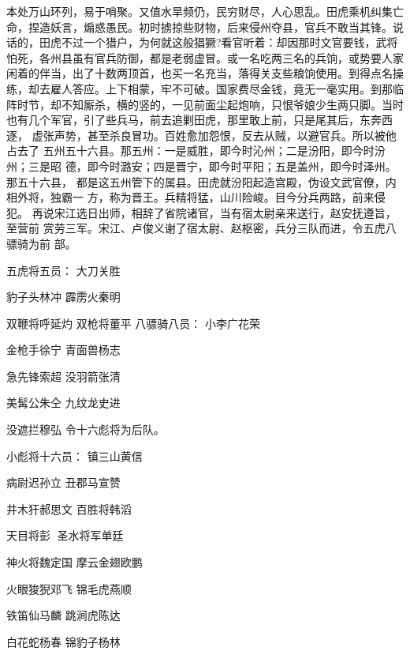 本处万山环列，易于哨聚。又值水旱频仍，民穷财尽，人心思乱。田虎乘机纠集亡
命，捏造妖言，煽惑愚民。初时掳掠些财物，后来侵州夺县，官兵不敢当其锋。说
话的，田虎不过一个猎户，为何就这般猖獗?看官听着：却因那时文官要钱，武将
怕死，各州县虽有官兵防御，都是老弱虚冒。或一名吃两三名的兵饷，或势要人家
闲着的伴当，出了十数两顶首，也买一名充当，落得关支些粮饷使用。到得点名操
练，却去雇人答应。上下相蒙，牢不可破。国家费尽金钱，竟无一毫实用。到那临
阵时节，却不知厮杀，横的竖的，一见前面尘起炮响，只恨爷娘少生两只脚。当时
也有几个军官，引了些兵马，前去追剿田虎，那里敢上前，只是尾其后，东奔西逐，
虚张声势，甚至杀良冒功。百姓愈加怨恨，反去从贼，以避官兵。所以被他占去了
五州五十六县。那五州：一是威胜，即今时沁州；二是汾阳，即今时汾州；三是昭
德，即今时潞安；四是晋宁，即今时平阳；五是盖州，即今时泽州。那五十六县，
都是这五州管下的属县。田虎就汾阳起造宫殿，伪设文武官僚，内相外将，独霸一
方，称为晋王。兵精将猛，山川险峻。目今分兵两路，前来侵犯。
再说宋江选日出师，相辞了省院诸官，当有宿太尉亲来送行，赵安抚遵旨，至营前
赏劳三军。宋江、卢俊义谢了宿太尉、赵枢密，兵分三队而进，令五虎八骠骑为前
部。

五虎将五员：
大刀关胜

豹子头林冲
霹雳火秦明

双鞭将呼延灼
双枪将董平
八骠骑八员：
小李广花荣

金枪手徐宁
青面兽杨志

急先锋索超
没羽箭张清

美髯公朱仝
九纹龙史进

没遮拦穆弘
令十六彪将为后队。

小彪将十六员：
镇三山黄信

病尉迟孙立
丑郡马宣赞

井木犴郝思文
百胜将韩滔

天目将彭
圣水将军单廷

神火将魏定国
摩云金翅欧鹏

火眼狻猊邓飞
锦毛虎燕顺

铁笛仙马麟
跳涧虎陈达

白花蛇杨春
锦豹子杨林

